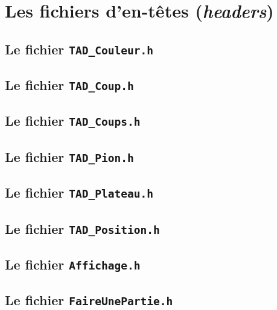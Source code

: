 
\chapter{Les fichiers d'en-têtes (\emph{headers})}
\section{Le fichier \tt{TAD\_Couleur.h}}


\section{Le fichier \tt{TAD\_Coup.h}}


\section{Le fichier \tt{TAD\_Coups.h}}


\section{Le fichier \tt{TAD\_Pion.h}}


\section{Le fichier \tt{TAD\_Plateau.h}}


\section{Le fichier \tt{TAD\_Position.h}}


\section{Le fichier \tt{Affichage.h}}


\section{Le fichier \tt{FaireUnePartie.h}}


